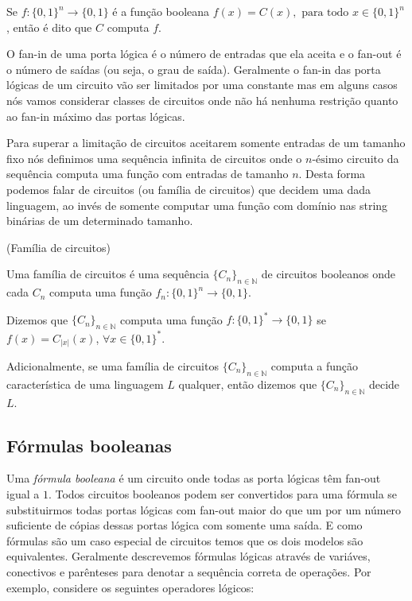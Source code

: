 \begin{defi}
Se $f: \{0, 1\}^{n} \to \{0, 1\}$ é a função booleana $f(x) = C(x), \text{ para todo } x \in \{0, 1\}^{n}$, então é dito que $C$ computa $f$.

\end{defi}

O fan-in de uma porta lógica é o número de entradas que ela aceita e o fan-out é o número de saídas (ou seja, o grau de saída). Geralmente o fan-in das porta lógicas de um circuito vão ser limitados por uma constante mas em alguns casos nós vamos considerar classes de circuitos onde não há nenhuma restrição quanto ao fan-in máximo das portas lógicas.

Para superar a limitação de circuitos aceitarem somente entradas de um tamanho fixo nós definimos uma sequência infinita de circuitos onde o $n\text{-ésimo}$ circuito da sequência computa uma função com entradas de tamanho $n$. Desta forma podemos falar de circuitos (ou família de circuitos) que decidem uma dada linguagem, ao invés de somente computar uma função com domínio nas string binárias de um determinado tamanho.

\begin{defi} (Família de circuitos)

Uma família de circuitos é uma sequência $\{C_{n}\}_{n \in \mathbb{N}}$ de circuitos booleanos onde cada $C_{n}$ computa uma função $f_{n}: \{0, 1\}^{n} \to \{0, 1\}$.

Dizemos que $\{C_{n}\}_{n \in \mathbb{N}}$ computa uma função $f: \{0, 1\}^{*} \to \{0, 1\}$ se $f(x) = C_{\lvert x \rvert}(x)$, $\forall x \in \{0, 1\}^{*}$.

\end{defi}

Adicionalmente, se uma família de circuitos $\{C_{n}\}_{n \in \mathbb{N}}$ computa a função característica de uma linguagem $L$ qualquer, então dizemos que $\{C_{n}\}_{n \in \mathbb{N}}$ decide $L$. 

\subsection{Fórmulas booleanas}

Uma \emph{fórmula booleana} é um circuito onde todas as porta lógicas têm fan-out igual a $1$. Todos circuitos booleanos podem ser convertidos para uma fórmula se substituirmos todas portas lógicas com fan-out maior do que um por um número suficiente de cópias dessas portas lógica com somente uma saída. E como fórmulas são um caso especial de circuitos temos que os dois modelos são equivalentes. Geralmente descrevemos fórmulas lógicas através de variáves, conectivos e parênteses para denotar a sequência correta de operações. Por exemplo, considere os seguintes operadores lógicos:

